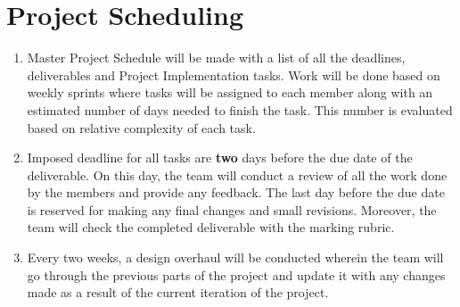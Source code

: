 \documentclass{article}
\begin{document}
\section{Project Scheduling}

\begin{enumerate}
\item Master Project Schedule will be made with a list of all the deadlines, deliverables and Project Implementation tasks. Work will be done based on weekly sprints where tasks will be assigned to each member along with an estimated number of days needed to finish the task. This number is evaluated based on relative complexity of each task.\\

\item Imposed deadline for all tasks are \textbf{two} days before the due date of the deliverable. On this day, the team will conduct a review of all the work done by the members and provide any feedback. The last day before the due date is reserved for making any final changes and small revisions. Moreover, the team will check the completed deliverable with the marking rubric.\\

\item Every two weeks, a design overhaul will be conducted wherein the team will go through the previous parts of the project and update it with any changes made as a result of the current iteration of the project.\\
\end{enumerate}
\end{document}
